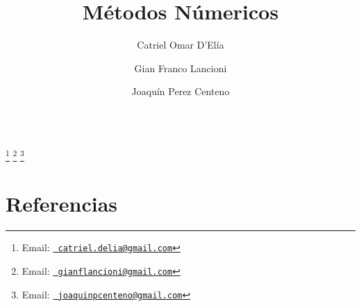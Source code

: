 \documentclass[11pt,spanish]{endm}
\begin{document}
\begin{verbatim}
\end{verbatim}\vspace{2.5cm}

\begin{frontmatter}

\title{Métodos Númericos}


\author{Catriel Omar D'Elía} 
\author{Gian Franco Lancioni}
\author{Joaquín Perez Centeno}
\address{Depatamento de Computación\\ Universidad de Buenos Aires\\ Buenos Aires, Argentina}

\thanks[myemail]{Email:
   \href{catriel.delia@gmail.com} {\texttt{\normalshape
   catriel.delia@gmail.com}}} \thanks[myemail1]{Email:
   \href{gianflancioni@gmail.com} {\texttt{\normalshape
   gianflancioni@gmail.com}}} \thanks[myemail2]{Email:
   \href{joaquinpcenteno@gmail.com} {\texttt{\normalshape
   joaquinpcenteno@gmail.com}}}



\end{frontmatter}





\section{Referencias}



\end{document}
